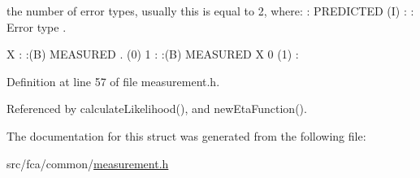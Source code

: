 the number of error types, usually this is equal to 2, where\-: \-: \-P\-R\-E\-D\-I\-C\-T\-E\-D (\-I) \-: \-: \-Error type . 

\-X \-: \-:(\-B) \-M\-E\-A\-S\-U\-R\-E\-D . (0) 1 \-: \-:(\-B) \-M\-E\-A\-S\-U\-R\-E\-D \-X 0 (1) \-: 

\-Definition at line 57 of file measurement.\-h.



\-Referenced by calculate\-Likelihood(), and new\-Eta\-Function().



\-The documentation for this struct was generated from the following file\-:\begin{DoxyCompactItemize}
\item 
src/fca/common/\hyperlink{common_2measurement_8h}{measurement.\-h}\end{DoxyCompactItemize}

